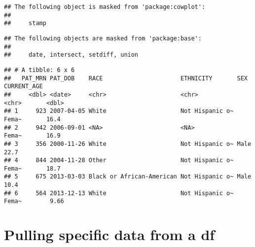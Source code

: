 \documentclass[
]{article}
\newenvironment{Shaded}{\begin{snugshade}}{\end{snugshade}}
\newcommand{\AttributeTok}[1]{\textcolor[rgb]{0.13,0.29,0.53}{#1}}
\newcommand{\CommentTok}[1]{\textcolor[rgb]{0.56,0.35,0.01}{\textit{#1}}}
\newcommand{\FunctionTok}[1]{\textcolor[rgb]{0.13,0.29,0.53}{\textbf{#1}}}
\newcommand{\NormalTok}[1]{#1}
\newcommand{\OtherTok}[1]{\textcolor[rgb]{0.56,0.35,0.01}{#1}}
\newcommand{\SpecialCharTok}[1]{\textcolor[rgb]{0.81,0.36,0.00}{\textbf{#1}}}
\newcommand{\StringTok}[1]{\textcolor[rgb]{0.31,0.60,0.02}{#1}}
\begin{document}
\begin{verbatim}
## The following object is masked from 'package:cowplot':
## 
##     stamp
\end{verbatim}

\begin{verbatim}
## The following objects are masked from 'package:base':
## 
##     date, intersect, setdiff, union
\end{verbatim}

\begin{Shaded}
\end{Shaded}

\begin{verbatim}
## # A tibble: 6 x 6
##   PAT_MRN PAT_DOB    RACE                      ETHNICITY       SEX   CURRENT_AGE
##     <dbl> <date>     <chr>                     <chr>           <chr>       <dbl>
## 1     923 2007-04-05 White                     Not Hispanic o~ Fema~       16.4 
## 2     942 2006-09-01 <NA>                      <NA>            Fema~       16.9 
## 3     356 2000-11-26 White                     Not Hispanic o~ Male        22.7 
## 4     844 2004-11-28 Other                     Not Hispanic o~ Fema~       18.7 
## 5     675 2013-03-03 Black or African-American Not Hispanic o~ Male        10.4 
## 6     564 2013-12-13 White                     Not Hispanic o~ Fema~        9.66
\end{verbatim}

\hypertarget{pulling-specific-data-from-a-df}{%
\section{Pulling specific data from a
df}\label{pulling-specific-data-from-a-df}}
\end{document}
